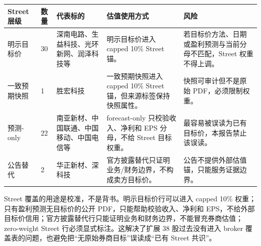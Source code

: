 \begin{exhibitbox}
\begin{tabularx}{\linewidth}{L{2.7cm}R{0.8cm}L{3.2cm}X X}
\toprule
\textbf{Street层级} & \textbf{数量} & \textbf{代表标的} & \textbf{估值使用方式} & \textbf{风险}\\
\midrule
明示目标价 & 30 & 深南电路、生益科技、光环新网、润泽科技等 & 明示目标价进入 capped 10\% Street 锚。 & 若目标价方法、日期或盈利预测与当前分母不匹配，Street 权重不得上调。\\
一致预期快照 & 1 & 胜宏科技 & 一致预期快照进入 capped 10\% Street 锚，但来源标签保持快照属性。 & 快照可审计但不是原始 PDF，必须限制权重。\\
预测-only & 22 & 南亚新材、中国联通、中国移动、中国电信等 & forecast-only 只校验收入、净利和 EPS 分母，不给 Street 目标权重。 & 最容易被误读为已有目标价，本报告禁止该误读。\\
公告替代 & 2 & 华正新材、深科技 & 官方披露替代只证明业务/财务边界，不构成卖方目标价。 & 公告不提供外部估值锚，只能服务证据边界。\\
\bottomrule
\end{tabularx}
\end{exhibitbox}

Street 覆盖的用途是校准，不是背书。明示目标价行可以进入 capped 10\% 权重；只有盈利预测无目标价的公开 PDF，只能帮助校验收入、净利和 EPS，不给外部目标价信用；官方披露替代行只能证明业务和财务边界，不能冒充券商估值；zero-weight Street 行必须显式标注。这解决了扩展 38 股过去没有进入 broker 覆盖表的问题，也避免把“无原始券商目标”误读成“已有 Street 共识”。

